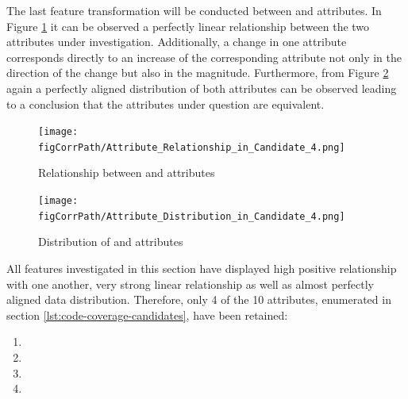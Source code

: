 \FloatBarrier

The last feature transformation will be conducted between \overallUncoveredConditions{} and \uncoveredConditions{} attributes. In Figure \ref{fig:candidate4-scatterplot} it can be observed a perfectly linear relationship between the two attributes under investigation. Additionally, a change in one attribute corresponds directly to an increase of the corresponding attribute not only in the direction of the change but also in the magnitude. Furthermore, from Figure \ref{fig:candidate4-distribution} again a perfectly aligned distribution of both attributes can be observed leading to a conclusion that the attributes under question are equivalent.

\begin{figure}[h!]
    \centering
    \texttt{[image: \\figCorrPath/Attribute\_Relationship\_in\_Candidate\_4.png]}
    \caption{Relationship between \overallUncoveredConditions{} and \uncoveredConditions{} attributes}
    \label{fig:candidate4-scatterplot}
\end{figure}

\begin{figure}[h!]
    \centering
    \texttt{[image: \\figCorrPath/Attribute\_Distribution\_in\_Candidate\_4.png]}
    \caption{Distribution of \overallUncoveredConditions{} and \uncoveredConditions{} attributes}
    \label{fig:candidate4-distribution}
\end{figure}

\FloatBarrier
All features investigated in this section have displayed high positive relationship with one another, very strong linear relationship as well as almost perfectly aligned data distribution. Therefore, only 4 of the 10 attributes, enumerated in section \ref{lst:code-coverage-candidates}, have been retained:

\begin{enumerate}
    \item \overallBranchCoverage{}
    \item \overallUncoveredLines{}
    \item \overallCoverage{}
    \item \overallUncoveredConditions{}
\end{enumerate}

